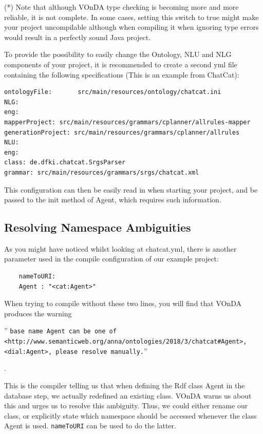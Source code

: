 \documentclass[a4paper]{report}
\newcommand{\vonda}{VOnDA\xspace}
\begin{document}
(*) Note that although \vonda type checking is becoming more and more reliable, it is not complete. In some cases, setting this switch to true might make your project uncompilable although when compiling it when ignoring type errors would result in a perfectly sound Java project.

To provide the possibility to easily change the Ontology, NLU and NLG components of your project, it is recommended to create a second yml file containing the following specifications (This is an example from ChatCat):

\begin{verbatim}
ontologyFile:       src/main/resources/ontology/chatcat.ini
NLG:
eng:
mapperProject: src/main/resources/grammars/cplanner/allrules-mapper
generationProject: src/main/resources/grammars/cplanner/allrules
NLU:
eng:
class: de.dfki.chatcat.SrgsParser
grammar: src/main/resources/grammars/srgs/chatcat.xml
\end{verbatim}

This configuration can then be easily read in when starting your project, and be passed to the init method of Agent, which requires such information.

\subsection{Resolving Namespace Ambiguities}

As you might have noticed whilst looking at chatcat.yml, there is another parameter used in the compile configuration of our example project:

\begin{verbatim}
	nameToURI:
	Agent : "<cat:Agent>"
\end{verbatim}

When trying to compile without these two lines, you will find that \vonda produces the warning \begin{small}'' \texttt{base name Agent can be one of  <http://www.semanticweb.org/anna/ontologies/2018/3/chatcat\#Agent>, <dial:Agent>, please resolve manually.}''
\end{small}.

This is the compiler telling us that when defining the Rdf class Agent in the database step, we actually redefined an existing class. \vonda warns us about this and urges us to resolve this ambiguity. Thus, we could either rename our class, or explicitly state which namespace should be accessed whenever the class Agent is used. \texttt{nameToURI} can be used to do the latter.
\end{document}
